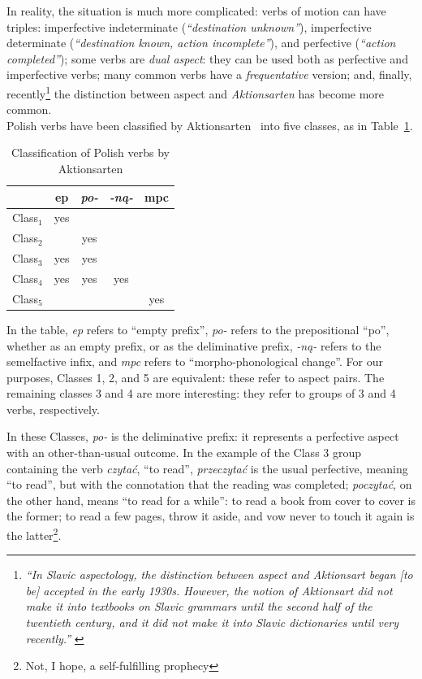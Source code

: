 \documentclass[11pt]{article}
\begin{document}
In reality, the situation is much more complicated: verbs of motion can
have triples: imperfective indeterminate ({\it ``destination unknown''}), 
imperfective determinate ({\it ``destination known, action incomplete''}),
and perfective ({\it ``action completed''}); some verbs are {\it dual aspect}:
they can be used both as perfective and imperfective verbs; many common
verbs have a {\it frequentative} version; and, finally, recently\footnote{
{\it ``In Slavic aspectology, the distinction between aspect and Aktionsart
began [to be] accepted in the early 1930s. However, the notion of Aktionsart did not make
it into textbooks on Slavic grammars until the second half of the twentieth century,
and it did not make it into Slavic dictionaries until very recently.''}
\citep[Ch.~2]{mlyn}}
the distinction between aspect and {\it Aktionsarten} has become more common.\\

Polish verbs have been classified by Aktionsarten~\citep[Ch.~4]{mlyn} into
five classes, as in Table~\ref{table:aktionsarten}. 

\begin{table}[htdp]
\caption{Classification of Polish verbs by Aktionsarten}
\label{table:aktionsarten}
\begin{center}
\begin{tabular}{|l|c|c|c|c|}
\hline
& ep & {\it po-} & {\it -n\k{a}-} & mpc\\
\hline
\hline
Class$_{1}$ & yes & & & \\
\hline
Class$_{2}$ &  & yes & & \\
\hline
Class$_{3}$ & yes & yes & & \\
\hline
Class$_{4}$ & yes & yes & yes & \\
\hline
Class$_{5}$ & & & & yes \\
\hline
\end{tabular}
\end{center}
\end{table}

In the table, {\it ep} refers to ``empty prefix'', {\it po-} refers
to the prepositional ``po'', whether as an empty prefix, or as the
deliminative prefix, {\it -n\k{a}-} refers to the semelfactive infix,
and {\it mpc} refers to ``morpho-phonological change''. For our
purposes, Classes 1, 2, and 5 are equivalent: these refer to aspect
pairs. The remaining classes 3 and 4 are more interesting: they 
refer to groups of 3 and 4 verbs, respectively.

In these Classes, {\it po-} is the deliminative prefix: it represents
a perfective aspect with an other-than-usual outcome. In the example
of the Class 3 group containing the verb {\it czyta\'{c}}, ``to read'',
{\it przeczyta\'{c}} is the usual perfective, meaning ``to read'', but
with the connotation that the reading was completed; {\it poczyta\'{c}},
on the other hand, means ``to read for a while'': to read a book from
cover to cover is the former; to read a few pages, throw it aside, and 
vow never to touch it again is the latter\footnote{Not, I hope, a 
self-fulfilling prophecy}.
\end{document}
